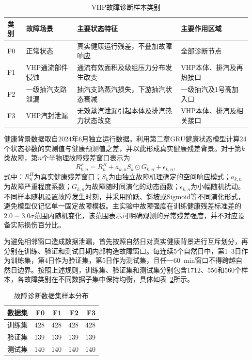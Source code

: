 \begin{table}[htbp]
    \centering
    \caption{VHP故障诊断样本类别}
    \label{tab:fault_classes_yangstyle}
    \begin{tabular}{p{1.0cm}p{4.2cm}p{5.2cm}p{3.3cm}}
        \toprule
        类别 & 故障场景 & 主要状态特征 & 主要作用区域 \\
        \midrule
        F0 & 正常状态 & 真实健康运行残差，不叠加故障响应 & 全部诊断节点 \\
        F1 & VHP通流部件侵蚀 & 通流有效面积及级组压力分布发生改变 & VHP本体、排汽及再热接口 \\
        F2 & 一级抽汽支路泄漏 & 抽汽支路蒸汽损失，下游抽汽状态衰减 & 一级抽汽及1号高加入口 \\
        F3 & VHP汽封泄漏 & 无效蒸汽泄漏引起本体及排汽热力状态改变 & VHP本体、排汽及相关接口 \\
        \bottomrule
    \end{tabular}
\end{table}

健康背景数据取自2024年6月独立运行数据。利用第二章GRU健康状态模型计算24个状态参数的实测值与健康预测值之差，并以此形成真实健康残差背景。对于第$k$类故障，第$n$个半物理故障残差窗口表示为
\begin{equation}
R_{k,n}^{F}=R_n^{H}+a_{k,n}S_k\odot G_{k,n}+\epsilon_{k,n},
\end{equation}
式中：$R_n^{H}$为真实健康残差窗口；$S_k$为由独立故障机理确定的空间响应模式；$a_{k,n}$为故障严重程度系数；$G_{k,n}$为故障随时间演化的动态函数；$\epsilon_{k,n}$为小幅随机扰动。不同样本随机设置故障发生时刻，并采用阶跃、斜坡或Sigmoid等不同演化形式，避免模型仅记忆单一固定故障模板。主实验中故障强度在训练健康残差标准差的$2.0\sim3.0\sigma$范围内随机变化，该范围表示可明确观测的异常残差强度，并不对应设备实际损伤百分比。

为避免相邻窗口造成数据泄漏，首先按照自然日对真实健康背景进行互斥划分，再分别在训练、验证和测试日期内部构造故障窗口。每连续5个自然日中，第1--3日作为训练集，第4日作为验证集，第5日作为测试集，且任一60~min窗口不得跨越自然日边界。按照上述规则，训练集、验证集和测试集分别包含1712、556和560个样本，各故障类别在不同数据子集中保持均衡，具体如表~\ref{tab:fault_dataset_yangstyle}所示。

\begin{table}[htbp]
    \centering
    \caption{故障诊断数据集样本分布}
    \label{tab:fault_dataset_yangstyle}
    \begin{tabular}{lrrrr}
        \toprule
        数据集 & F0 & F1 & F2 & F3 \\
        \midrule
        训练集 & 428 & 428 & 428 & 428 \\
        验证集 & 139 & 139 & 139 & 139 \\
        测试集 & 140 & 140 & 140 & 140 \\
        \bottomrule
    \end{tabular}
\end{table}

